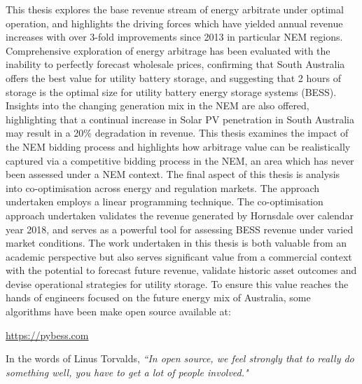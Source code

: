\documentclass[11pt,fleqn]{book} %
\begin{document}
This thesis explores the base revenue stream of energy arbitrate under optimal operation, and highlights the driving forces which have yielded annual revenue increases with over 3-fold improvements since 2013 in particular NEM regions. Comprehensive exploration of energy arbitrage has been evaluated with the inability to perfectly forecast wholesale prices, confirming that South Australia offers the best value for utility battery storage, and suggesting that 2 hours of storage is the optimal size for utility battery energy storage systems (BESS). Insights into the changing generation mix in the NEM are also offered, highlighting that a continual increase in Solar PV penetration in South Australia may result in a 20\% degradation in revenue. This thesis examines the impact of the NEM bidding process and highlights how arbitrage value can be realistically captured via a competitive bidding process in the NEM, an area which has never been assessed under a NEM context. The final aspect of this thesis is analysis into co-optimisation across energy and regulation markets. The approach undertaken employs a linear programming technique. The co-optimisation approach undertaken validates the revenue generated by Hornsdale over calendar year 2018, and serves as a powerful tool for assessing BESS revenue under varied market conditions.
\newline
\newline
The work undertaken in this thesis is both valuable from an academic perspective but also serves significant value from a commercial context with the potential to forecast future revenue, validate historic asset outcomes and devise operational strategies for utility storage. To ensure this value reaches the hands of engineers focused on the future energy mix of Australia, some algorithms have been make open source available at: 
 \begin{center}
     \url{https://pybess.com}
 \end{center}
In the words of Linus Torvalds,
\newline
\newline
\textit{``In open source, we feel strongly that to really do something well, you have to get a lot of people involved."}
\end{document}
